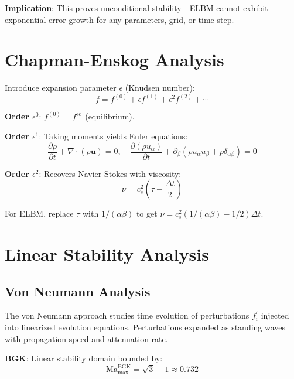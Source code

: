 \textbf{Implication}: This proves unconditional stability—ELBM cannot exhibit exponential error growth for any parameters, grid, or time step.

\section{Chapman-Enskog Analysis}

Introduce expansion parameter $\epsilon$ (Knudsen number):
\begin{equation}
f = f^{(0)} + \epsilon f^{(1)} + \epsilon^2 f^{(2)} + \cdots
\end{equation}

\textbf{Order $\epsilon^0$}: $f^{(0)} = f^{\mathrm{eq}}$ (equilibrium).

\textbf{Order $\epsilon^1$}: Taking moments yields Euler equations:
\begin{equation}
\frac{\partial \rho}{\partial t} + \nabla \cdot (\rho\mathbf{u}) = 0, \quad \frac{\partial (\rho u_\alpha)}{\partial t} + \partial_\beta(\rho u_\alpha u_\beta + p\delta_{\alpha\beta}) = 0
\end{equation}

\textbf{Order $\epsilon^2$}: Recovers Navier-Stokes with viscosity:
\begin{equation}
\nu = c_s^2\left(\tau - \frac{\Delta t}{2}\right)
\end{equation}

For ELBM, replace $\tau$ with $1/(\alpha\beta)$ to get $\nu = c_s^2(1/(\alpha\beta) - 1/2)\Delta t$.

\section{Linear Stability Analysis}

\subsection{Von Neumann Analysis}

The von Neumann approach studies time evolution of perturbations $f_i^{\prime}$ injected into linearized evolution equations. Perturbations expanded as standing waves with propagation speed and attenuation rate.

\textbf{BGK}: Linear stability domain bounded by:
\begin{equation}
\mathrm{Ma}_{\max}^{\mathrm{BGK}} = \sqrt{3} - 1 \approx 0.732
\end{equation}

